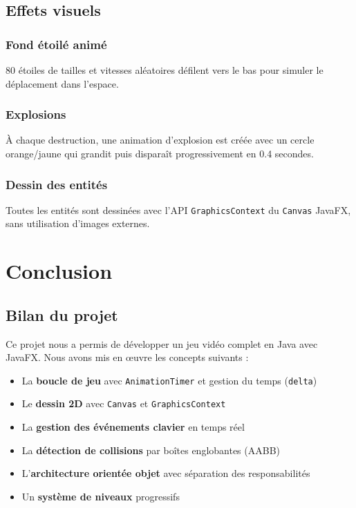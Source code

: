 \documentclass[12pt,a4paper]{report}
\begin{document}
\section{Effets visuels}
\subsection{Fond étoilé animé}
80 étoiles de tailles et vitesses aléatoires défilent vers le bas pour simuler le déplacement dans l'espace.

\subsection{Explosions}
À chaque destruction, une animation d'explosion est créée avec un cercle orange/jaune qui grandit puis disparaît progressivement en 0.4 secondes.

\subsection{Dessin des entités}
Toutes les entités sont dessinées avec l'API \texttt{GraphicsContext} du \texttt{Canvas} JavaFX, sans utilisation d'images externes.

\chapter{Conclusion}

\section{Bilan du projet}
Ce projet nous a permis de développer un jeu vidéo complet en Java avec JavaFX. Nous avons mis en \oe{}uvre les concepts suivants :

\begin{itemize}[leftmargin=1.5cm]
  \item La \textbf{boucle de jeu} avec \texttt{AnimationTimer} et gestion du temps (\texttt{delta})
  \item Le \textbf{dessin 2D} avec \texttt{Canvas} et \texttt{GraphicsContext}
  \item La \textbf{gestion des événements clavier} en temps réel
  \item La \textbf{détection de collisions} par boîtes englobantes (AABB)
  \item L'\textbf{architecture orientée objet} avec séparation des responsabilités
  \item Un \textbf{système de niveaux} progressifs
\end{itemize}
\end{document}
